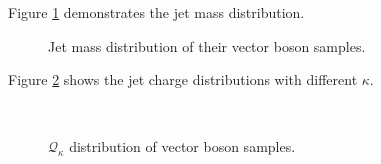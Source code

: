 \documentclass[12pt]{article}
\begin{document}
		Figure \ref{fig:jet_mass_distribution} demonstrates the jet mass distribution.
		\begin{figure}[htpb]
			\centering
			\caption{Jet mass distribution of their vector boson samples.}
			\label{fig:jet_mass_distribution}
		\end{figure}

		Figure \ref{fig:jet_charge_different_kappa} shows the jet charge distributions with different $\kappa$.
		\begin{figure}[htpb]
			\centering
			\\
			\caption{$\mathcal{Q}_\kappa$ distribution of vector boson samples.}
			\label{fig:jet_charge_different_kappa}
		\end{figure}
\end{document}
